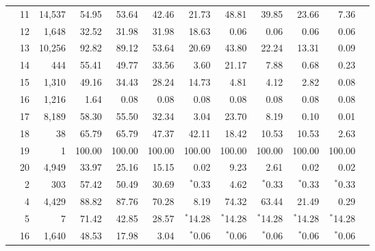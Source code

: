\begin{table}
{\begin{tabular}{crrrrrrrrrrr}
& 11 & 14,537 & 54.95 & 53.64 & 42.46 & 21.73 & 48.81 & 39.85 & 23.66 & 7.36 \\ 
& 12 & 1,648 & 32.52 & 31.98 & 31.98 & 18.63 & 0.06 & 0.06 & 0.06 & 0.06 \\ 
& 13 & 10,256 & 92.82 & 89.12 & 53.64 & 20.69 & 43.80 & 22.24 & 13.31 & 0.09 \\ 
& 14 & 444 & 55.41 & 49.77 & 33.56 & 3.60 & 21.17 & 7.88 & 0.68 & 0.23 \\ 
& 15 & 1,310 & 49.16 & 34.43 & 28.24 & 14.73 & 4.81 & 4.12 & 2.82 & 0.08 \\ 
& 16 & 1,216 & 1.64 & 0.08 & 0.08 & 0.08 & 0.08 & 0.08 & 0.08 & 0.08 \\ 
& 17 & 8,189 & 58.30 & 55.50 & 32.34 & 3.04 & 23.70 & 8.19 & 0.10 & 0.01 \\ 
& 18 & 38 & 65.79 & 65.79 & 47.37 & 42.11 & 18.42 & 10.53 & 10.53 & 2.63 \\ 
& 19 & 1 & 100.00 & 100.00 & 100.00 & 100.00 & 100.00 & 100.00 & 100.00 & 100.00 \\ 
& 20 & 4,949 & 33.97 & 25.16 & 15.15 & 0.02 & 9.23 & 2.61 & 0.02 & 0.02 \\ 
\noalign{\medskip}
\parbox[t]{2mm}{} &
2 & 303 & 57.42 & 50.49 & 30.69 & $^*$0.33 & 4.62 & $^*$0.33 & $^*$0.33 & $^*$0.33 \\
& 4 & 4,429 & 88.82 & 87.76 & 70.28 & 8.19 & 74.32 & 63.44 & 21.49 & 0.29 \\
& 5 & 7 & 71.42 & 42.85 & 28.57 & $^*$14.28 & $^*$14.28 & $^*$14.28 & $^*$14.28 & $^*$14.28 \\
& 16 & 1,640 & 48.53 & 17.98 & 3.04 & $^*$0.06 & $^*$0.06 & $^*$0.06 & $^*$0.06 & $^*$0.06 \\
\hline
\end{tabular}
}
\end{table} 

